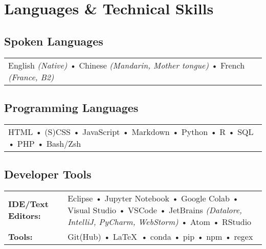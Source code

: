 \documentclass[10pt,a4paper]{cv_public}
\begin{document}
\section{Languages \& Technical Skills}

\subsection{Spoken Languages}
\begingroup
\renewcommand{\arraystretch}{1.5} 
\centering
\begin{tabular}{P{6in}}
English \textsl{(Native)} • Chinese \textsl{(Mandarin, Mother tongue)} • French \textsl{(France, B2)} \\ 
\end{tabular}
\endgroup

\vspace{7.5pt}
\subsection{Programming Languages}
\begingroup
\renewcommand{\arraystretch}{1.5} 
\centering
\begin{tabular}{P{6in}}
HTML • (S)CSS • JavaScript • Markdown • Python • R • SQL • PHP • Bash/Zsh
\end{tabular}
\endgroup

\vspace{7.5pt}
\subsection{Developer Tools}
\begingroup
\renewcommand{\arraystretch}{1.5} 
\begin{tabular}{p{1.5in}<{\raggedleft\arraybackslash}p{4.435in}<{\raggedright\arraybackslash}}
{\bf IDE/Text Editors:} & Eclipse • Jupyter Notebook • Google Colab • Visual Studio • VSCode • JetBrains \textsl{(Datalore, IntelliJ, PyCharm, WebStorm)} • Atom • RStudio \\
{\bf Tools:} & Git(Hub) • \LaTeX\ • conda • pip • npm • regex \\
\end{tabular}
\endgroup

\vspace{7.5pt}
\end{document}
